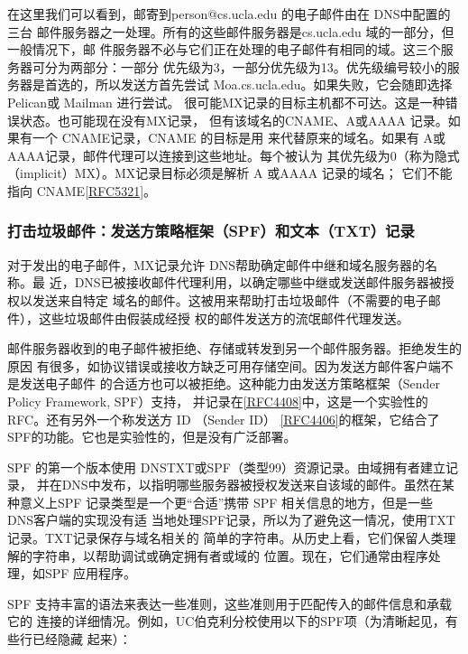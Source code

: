在这里我们可以看到，邮寄到person@cs.ucla.edu 的电子邮件由在 DNS中配置的三台
邮件服务器之一处理。所有的这些邮件服务器是cs.ucla.edu 域的一部分，但一般情况下，邮
件服务器不必与它们正在处理的电子邮件有相同的域。这三个服务器可分为两部分：一部分
优先级为3，一部分优先级为13。优先级编号较小的服务器是首选的，所以发送方首先尝试
Moa.cs.ucla.edu。如果失败，它会随即选择 Pelican或 Mailman 进行尝试。
很可能MX记录的目标主机都不可达。这是一种错误状态。也可能现在没有MX记录，
但有该域名的CNAME、A或AAAA 记录。如果有一个 CNAME记录，CNAME 的目标是用
来代替原来的域名。如果有 A或AAAA记录，邮件代理可以连接到这些地址。每个被认为
其优先级为0（称为隐式 （implicit）MX）。MX记录目标必须是解析 A 或AAAA 记录的域名；
它们不能指向 CNAME\href{https://www.rfc-editor.org/rfc/rfc5321}{[RFC5321]}。

\subsubsection{打击垃圾邮件：发送方策略框架（SPF）和文本（TXT）记录}

对于发出的电子邮件，MX记录允许 DNS帮助确定邮件中继和域名服务器的名称。最
近，DNS已被接收邮件代理利用，以确定哪些中继或发送邮件服务器被授权以发送来自特定
域名的邮件。这被用来帮助打击垃圾邮件（不需要的电子邮件），这些垃圾邮件由假装成经授
权的邮件发送方的流氓邮件代理发送。

邮件服务器收到的电子邮件被拒绝、存储或转发到另一个邮件服务器。拒绝发生的原因
有很多，如协议错误或接收方缺乏可用存储空间。因为发送方邮件客户端不是发送电子邮件
的合适方也可以被拒绝。这种能力由发送方策略框架（Sender Policy Framework, SPF）支持，
并记录在\href{https://www.rfc-editor.org/rfc/rfc4408}{[RFC4408]}中，这是一个实验性的 RFC。还有另外一个称发送方 ID （Sender ID）
\href{https://www.rfc-editor.org/rfc/rfc4406}{[RFC4406]}的框架，它结合了 SPF的功能。它也是实验性的，但是没有广泛部署。

SPF 的第一个版本使用 DNSTXT或SPF（类型99）资源记录。由域拥有者建立记录，
并在DNS中发布，以指明哪些服务器被授权发送来自该域的邮件。虽然在某种意义上SPF
记录类型是一个更“合适”携带 SPF 相关信息的地方，但是一些 DNS客户端的实现没有适
当地处理SPF记录，所以为了避免这一情况，使用TXT记录。TXT记录保存与域名相关的
简单的字符串。从历史上看，它们保留人类理解的字符串，以帮助调试或确定拥有者或域的
位置。现在，它们通常由程序处理，如SPF 应用程序。

SPF 支持丰富的语法来表达一些准则，这些准则用于匹配传入的邮件信息和承载它的
连接的详细情况。例如，UC伯克利分校使用以下的SPF项（为清晰起见，有些行已经隐藏
起来）：

